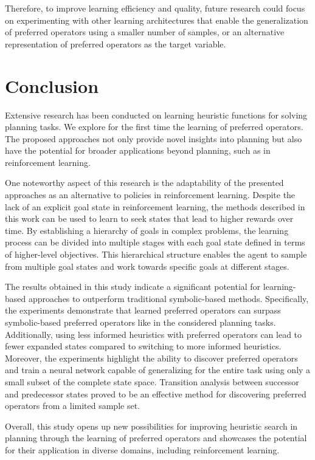 \documentclass[ppgc,diss,english]{iiufrgs}
\begin{document}
Therefore, to improve learning efficiency and quality, future research could focus on experimenting with other learning architectures that enable the generalization of preferred operators using a smaller number of samples, or an alternative representation of preferred operators as the target variable.

\chapter{Conclusion}
\label{cha:conclusion}
Extensive research has been conducted on learning heuristic functions for solving planning tasks. We explore for the first time the learning of preferred operators. The proposed approaches not only provide novel insights into planning but also have the potential for broader applications beyond planning, such as in reinforcement learning.

One noteworthy aspect of this research is the adaptability of the presented approaches as an alternative to policies in reinforcement learning. Despite the lack of an explicit goal state in reinforcement learning, the methods described in this work can be used to learn to seek states that lead to higher rewards over time. By establishing a hierarchy of goals in complex problems, the learning process can be divided into multiple stages with each goal state defined in terms of higher-level objectives. This hierarchical structure enables the agent to sample from multiple goal states and work towards specific goals at different stages.

The results obtained in this study indicate a significant potential for learning-based approaches to outperform traditional symbolic-based methods. Specifically, the experiments demonstrate that learned preferred operators can surpass symbolic-based preferred operators like \poff in the considered planning tasks. Additionally, using less informed heuristics with preferred operators can lead to fewer expanded states compared to switching to more informed heuristics. Moreover, the experiments highlight the ability to discover preferred operators and train a neural network capable of generalizing for the entire task using only a small subset of the complete state space. Transition analysis between successor and predecessor states proved to be an effective method for discovering preferred operators from a limited sample set.

Overall, this study opens up new possibilities for improving heuristic search in planning through the learning of preferred operators and showcases the potential for their application in diverse domains, including reinforcement learning.
\end{document}
